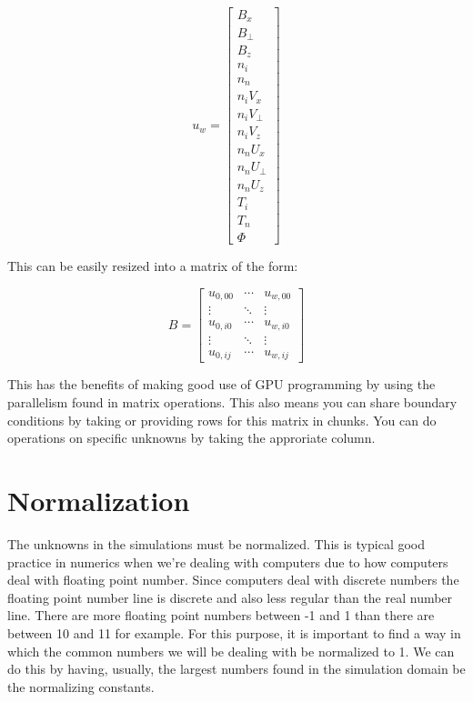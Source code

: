 \documentclass[12pt,upcase]{umlthesis}
\begin{document}
\begin{equation}
	u_w = 
	\begin{bmatrix}
		B_x \\
		B_{\perp} \\
		B_z \\
		n_i \\
		n_n \\
		n_i V_x \\
		n_i V_{\perp} \\
		n_i V_z \\
		n_n U_x \\
		n_n U_{\perp} \\
		n_n U_z \\
		T_i \\
		T_n \\
		\Phi
	\end{bmatrix}
\end{equation}

This can be easily resized into a matrix of the form:

\begin{equation}
	B =
	\begin{bmatrix}
		u_{0,00} & \cdots  & u_{w,00} \\
		\vdots   & \ddots & \vdots \\
		u_{0,i0} & \cdots & u_{w,i0} \\
		\vdots   & \ddots & \vdots \\
		u_{0,ij} & \cdots  & u_{w,ij}
	\end{bmatrix}
\end{equation}

This has the benefits of making good use of GPU programming by using the parallelism found in matrix operations. This also means you can share boundary conditions by taking or providing rows for this matrix in chunks. You can do operations on specific unknowns by taking the approriate column.

\section{Normalization}\label{sec:normalization}

The unknowns in the simulations must be normalized. This is typical good practice in numerics when we're dealing with computers due to how computers deal with floating point number. Since computers deal with discrete numbers the floating point number line is discrete and also less regular than the real number line. There are more floating point numbers between -1 and 1 than there are between 10 and 11 for example. For this purpose, it is important to find a way in which the common numbers we will be dealing with be normalized to 1. We can do this by having, usually, the largest numbers found in the simulation domain be the normalizing constants.
\end{document}
